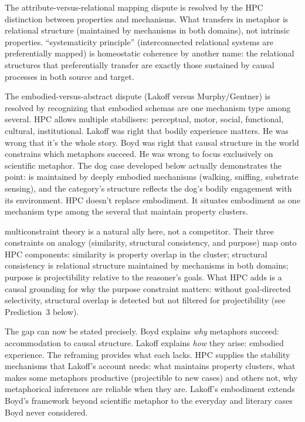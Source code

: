 \documentclass[12pt]{article}
\begin{document}
The attribute-versus-relational mapping dispute \citep{murphy1996, gentner1983} is resolved by the HPC distinction between properties and mechanisms. What transfers in metaphor is relational structure (maintained by mechanisms in both domains), not intrinsic properties. \textcite[163]{gentner1983} \enquote{systematicity principle} (interconnected relational systems are preferentially mapped) is homeostatic coherence by another name: the relational structures that preferentially transfer are exactly those sustained by causal processes in both source and target.

The embodied-versus-abstract dispute (Lakoff versus Murphy/Gentner) is resolved by recognizing that embodied schemas are one mechanism type among several. HPC allows multiple stabilisers: perceptual, motor, social, functional, cultural, institutional. Lakoff was right that bodily experience matters. He was wrong that it's the whole story. Boyd was right that causal structure in the world constrains which metaphors succeed. He was wrong to focus exclusively on scientific metaphor. The dog case developed below actually demonstrates the point:  is maintained by deeply embodied mechanisms (walking, sniffing, substrate sensing), and the category's structure reflects the dog's bodily engagement with its environment. HPC doesn't replace embodiment. It situates embodiment as one mechanism type among the several that maintain property clusters.

 multiconstraint theory is a natural ally here, not a competitor. Their three constraints on analogy (similarity, structural consistency, and purpose) map onto HPC components: similarity is property overlap in the cluster; structural consistency is relational structure maintained by mechanisms in both domains; purpose is projectibility relative to the reasoner's goals. What HPC adds is a causal grounding for why the purpose constraint matters: without goal-directed selectivity, structural overlap is detected but not filtered for projectibility (see Prediction~3 below).

The gap can now be stated precisely. Boyd explains \emph{why} metaphors succeed: accommodation to causal structure. Lakoff explains \emph{how} they arise: embodied experience. The reframing provides what each lacks. HPC supplies the stability mechanisms that Lakoff's account needs: what maintains property clusters, what makes some metaphors productive (projectible to new cases) and others not, why metaphorical inferences are reliable when they are. Lakoff's embodiment extends Boyd's framework beyond scientific metaphor to the everyday and literary cases Boyd never considered.
\end{document}

